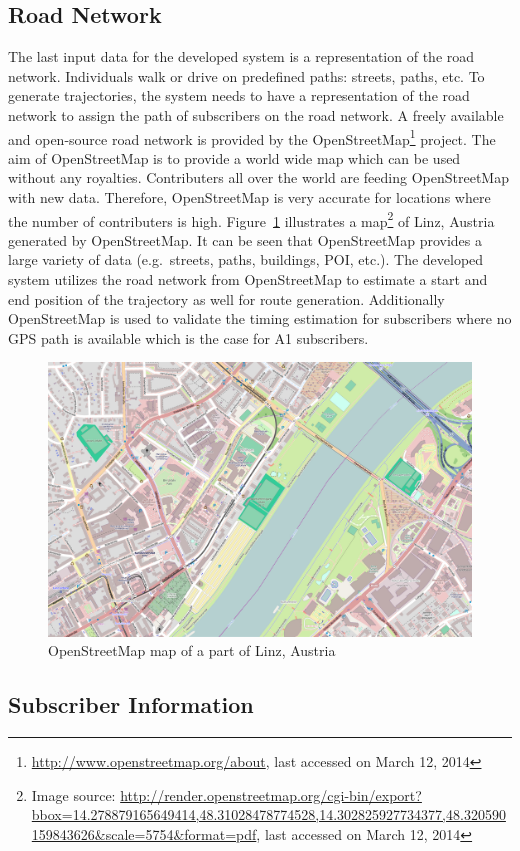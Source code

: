 \documentclass[master,english]{hgbthesis}
\begin{document}
	\subsection{Road Network}
	The last input data for the developed system is a representation of the road network. Individuals walk or drive on predefined paths: streets, paths, etc. To generate trajectories, the system needs to have a representation of the road network to assign the path of subscribers on the road network. A freely available and open-source road network is provided by the OpenStreetMap\footnote{\url{http://www.openstreetmap.org/about}, last accessed on March 12, 2014} project. The aim of OpenStreetMap is to provide a world wide map which can be used without any royalties. Contributers all over the world are feeding OpenStreetMap with new data. Therefore, OpenStreetMap is very accurate for locations where the number of contributers is high. Figure~\ref{fig:map_linz} illustrates a map\footnote{Image source: \url{http://render.openstreetmap.org/cgi-bin/export?bbox=14.278879165649414,48.31028478774528,14.302825927734377,48.320590159843626&scale=5754&format=pdf}, last accessed on March 12, 2014} of Linz, Austria generated by OpenStreetMap. It can be seen that OpenStreetMap provides a large variety of data (e.g.\ streets, paths, buildings, POI, etc.).
	The developed system utilizes the road network from OpenStreetMap to estimate a start and end position of the trajectory as well for route generation. Additionally OpenStreetMap is used to validate the timing estimation for subscribers where no GPS path is available which is the case for A1 subscribers.
	\begin{figure}
		\centering
		\includegraphics[width=0.7\linewidth]{./images/map_linz}
		\caption{OpenStreetMap map of a part of Linz, Austria}
		\label{fig:map_linz}
	\end{figure}
\subsection{Subscriber Information}
\end{document}
